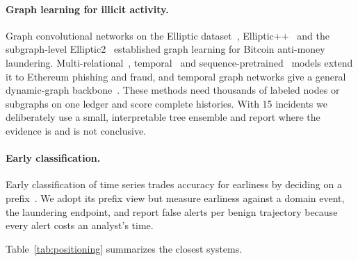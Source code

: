 \paragraph{Graph learning for illicit activity.}
Graph convolutional networks on the Elliptic dataset~\cite{weber2019elliptic}, Elliptic++~\cite{elmougy2023ellipticpp} and the subgraph-level Elliptic2~\cite{bellei2024elliptic2} established graph learning for Bitcoin anti-money laundering.
Multi-relational~\cite{hyun2023aml}, temporal~\cite{alarab2023graphlstm,patel2022evangcn} and sequence-pretrained~\cite{li2022ttagn,hu2023bert4eth} models extend it to Ethereum phishing and fraud, and temporal graph networks give a general dynamic-graph backbone~\cite{rossi2020tgn}.
These methods need thousands of labeled nodes or subgraphs on one ledger and score complete histories.
With 15 incidents we deliberately use a small, interpretable tree ensemble and report where the evidence is and is not conclusive.

\paragraph{Early classification.}
Early classification of time series trades accuracy for earliness by deciding on a prefix~\cite{xing2012early,gupta2020early}.
We adopt its prefix view but measure earliness against a domain event, the laundering endpoint, and report false alerts per benign trajectory because every alert costs an analyst's time.

Table~\ref{tab:positioning} summarizes the closest systems.

\begin{table}[t]
\centering
\caption{Positioning against the closest systems. ``Laund.\ path'': models multi-step post-exploit flows; ``Prefix'': emits a decision before the flow completes; ``Calib.'': outputs a calibrated probability.}
\label{tab:positioning}
\setlength{\tabcolsep}{3pt}
\small
{}
\end{table}
